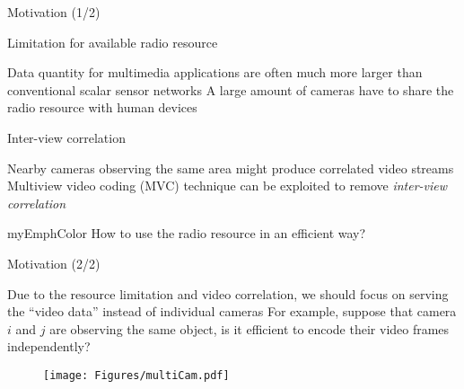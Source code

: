 \begin{frame}{Motivation (1/2)}
%
\begin{itemize}
	\myItem Limitation for available radio resource
	\begin{itemize}
		\mySubItem Data quantity for multimedia applications are often much more larger than conventional scalar sensor networks
		\mySubItem A large amount of cameras have to share the radio resource with human devices
	\end{itemize}
	\myItem Inter-view correlation
	\begin{itemize}
		\mySubItem Nearby cameras observing the same area might produce correlated video streams
		\mySubItem Multiview video coding (MVC) technique can be exploited to remove \emph{inter-view correlation}
	\end{itemize}
\end{itemize}
%
\begin{beamercolorbox}[center,shadow=true,rounded=true]{myEmphColor}
How to use the radio resource in an efficient way?
\end{beamercolorbox}
%
\end{frame}
\begin{frame}{Motivation (2/2)}
\begin{itemize}
	\myItem Due to the resource limitation and video correlation, we should focus on serving the ``video data'' instead of individual cameras
	\myItem For example, suppose that camera $i$ and $j$ are observing the same object, is it efficient to encode their video frames independently?
\end{itemize}
%
\begin{figure}
\centering
\texttt{[image: Figures/multiCam.pdf]}
\end{figure}
%
\end{frame}